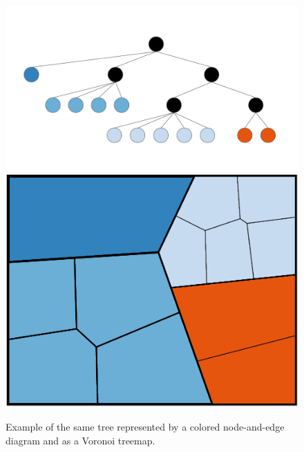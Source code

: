 \documentclass{acm_proc_article-sp} \usepackage{cite}
\begin{document}

%

\begin{figure}
        \centering
	 \includegraphics[width=\columnwidth]{source-images/simple-tree-colored.png}
	\includegraphics[width=\columnwidth]{source-images/simple-name-3-cropped.PNG}
        \caption{Example of the same tree represented by a colored node-and-edge diagram and as a Voronoi treemap.}
\label{tree:example}
\end{figure}
\end{document}
